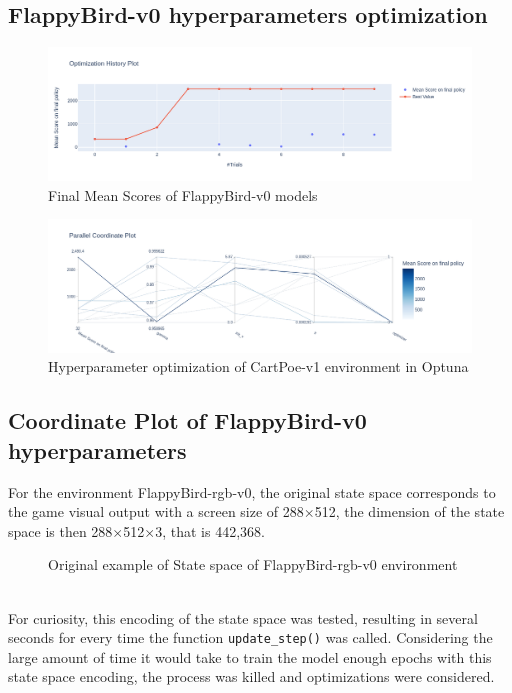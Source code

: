 \documentclass[11pt,a4paper,twocolumn]{IEEEtran}
\begin{document}
		\subsection{\textbf{FlappyBird-v0 hyperparameters optimization}}\vspace*{-.5cm}
		\begin{figure}[h]
			\centering\includegraphics[width=1\linewidth]{../imgs/optuna_fbv0_1}\vspace*{-.7cm}
			\caption{Final Mean Scores of FlappyBird-v0 models}
			\label{fig:fbv01opt}
		\end{figure}
	\begin{figure}[h]
		\centering\includegraphics[width=1\linewidth]{../imgs/optuna_fbv0_2}\vspace*{-.7cm}
		\caption{Hyperparameter optimization of CartPoe-v1 environment in Optuna}
		\label{fig:fbv02opt}
	\end{figure}
		\newpage
		\subsection{\textbf{Coordinate Plot of FlappyBird-v0 hyperparameters}}
		\label{section:aprgb}
		For the environment FlappyBird-rgb-v0, the original state space corresponds to the game visual output with a screen size of 288$\times$512, the dimension of the state space is then 288$\times$512$\times$3, that is 442,368.\vspace*{-1cm}\\
		\begin{figure}[h]
			\centering
			\vspace*{-.7cm}
			\caption{Original example of State space of FlappyBird-rgb-v0 environment}
		\end{figure}\\
		For curiosity, this encoding of the state space was tested, resulting in several seconds for every time the function \texttt{update\_step()} was called. Considering the large amount of time it would take to train the model enough epochs with this state space encoding, the process was killed and optimizations were considered.\medskip\\
		
\end{document}
